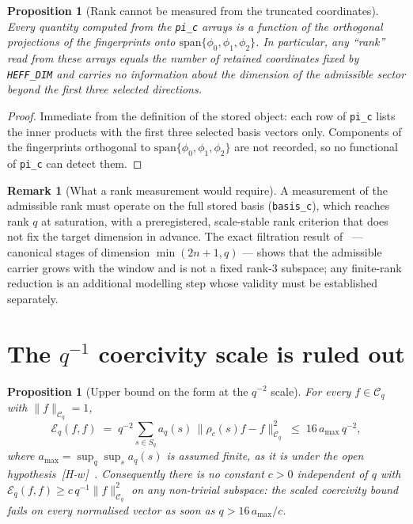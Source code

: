 \documentclass[11pt,a4paper]{article}
\theoremstyle{plain}
\newtheorem{proposition}[theorem]{Proposition}
\theoremstyle{definition}
\newtheorem{remark}[theorem]{Remark}
\newcommand{\Eq}{\mathcal{E}_q}
\newcommand{\Cq}{\mathcal{C}_q}
\begin{document}
  \begin{proposition}[Rank cannot be measured from the truncated coordinates]
    \label{prop:truncation}
    Every quantity computed from the \texttt{pi\_c} arrays is a function of the
    orthogonal projections of the fingerprints onto
    $\mathrm{span}\{\phi_0, \phi_1, \phi_2\}$.
    In particular, any ``rank'' read from these arrays equals the number of retained
    coordinates fixed by \texttt{HEFF\_DIM} and carries no information about the
    dimension of the admissible sector beyond the first three selected directions.
  \end{proposition}

  \begin{proof}
    Immediate from the definition of the stored object: each row of \texttt{pi\_c} lists
    the inner products with the first three selected basis vectors only.
    Components of the fingerprints orthogonal to
    $\mathrm{span}\{\phi_0,\phi_1,\phi_2\}$ are not recorded, so no functional of
    \texttt{pi\_c} can detect them.
  \end{proof}

  \begin{remark}[What a rank measurement would require]
    \label{rem:rank-protocol}
    A measurement of the admissible rank must operate on the full stored basis
    (\texttt{basis\_c}), which reaches rank $q$ at saturation, with a preregistered,
    scale-stable rank criterion that does not fix the target dimension in advance.
    The exact filtration result of~\cite{Beau2026q5a} --- canonical stages of dimension
    $\min(2n+1, q)$ --- shows that the admissible carrier grows with the window and is
    not a fixed rank-3 subspace; any finite-rank reduction is an additional modelling
    step whose validity must be established separately.
  \end{remark}

  \section{The $q^{-1}$ coercivity scale is ruled out}
  \label{sec:coercivity}

  \begin{proposition}[Upper bound on the form at the $q^{-2}$ scale]
    \label{prop:no-coercivity}
    For every $f \in \Cq$ with $\|f\|_{\Cq} = 1$,
    \[
      \Eq(f, f)
      \;=\; q^{-2} \sum_{s \in S_q} a_q(s)\, \|\rho_c(s)f - f\|^2_{\Cq}
      \;\le\; 16\, a_{\max}\, q^{-2},
    \]
    where $a_{\max} = \sup_q \sup_s a_q(s)$ is assumed finite, as it is under the open
    hypothesis~[H-$w$]~\cite{Beau2026w1}.
    Consequently there is no constant $c > 0$ independent of $q$ with
    $\Eq(f,f) \ge c\, q^{-1} \|f\|^2_{\Cq}$ on any non-trivial subspace: the scaled
    coercivity bound fails on every normalised vector as soon as $q > 16\,a_{\max}/c$.
  \end{proposition}
\end{document}
